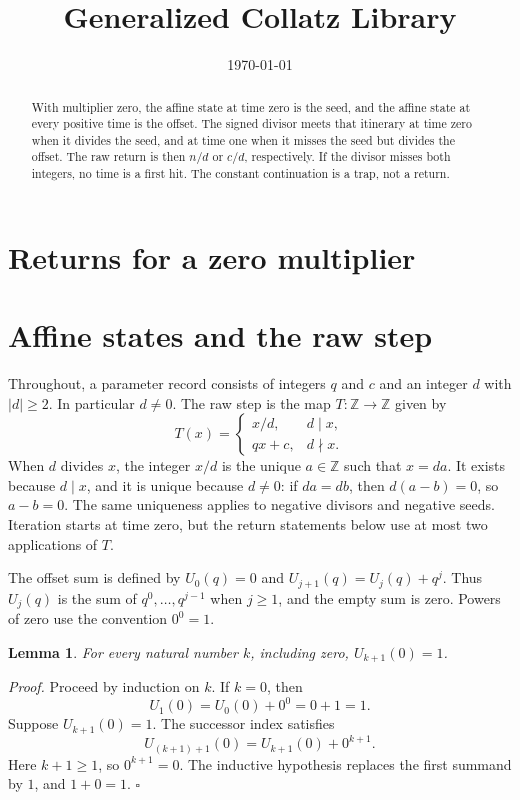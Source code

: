 \documentclass[11pt,letterpaper]{article}
\title{Generalized Collatz Library}
\author{}
\date{\today}
\newcommand{\Z}{\mathbb{Z}}
\newcommand{\Map}[3]{#1 \colon #2 \to #3}
\newtheorem{lemma}[theorem]{Lemma}
\newenvironment{proof}{\noindent\textit{Proof.}}{\hfill\(\square\)}
\begin{document}
\maketitle
\section*{Returns for a zero multiplier}

\begin{abstract}
With multiplier zero, the affine state at time zero is the seed, and the affine state at every positive time is the offset. The signed divisor meets that itinerary at time zero when it divides the seed, and at time one when it misses the seed but divides the offset. The raw return is then \(n/d\) or \(c/d\), respectively. If the divisor misses both integers, no time is a first hit. The constant continuation is a trap, not a return.
\end{abstract}

\section{Affine states and the raw step}

Throughout, a parameter record consists of integers \(q\) and \(c\) and an integer \(d\) with \(|d|\ge 2\). In particular \(d\neq 0\). The raw step is the map \(\Map{T}{\Z}{\Z}\) given by
\[
T(x)=\begin{cases}
x/d, & d\mid x,\\
qx+c, & d\nmid x.
\end{cases}
\]
When \(d\) divides \(x\), the integer \(x/d\) is the unique \(a\in\Z\) such that \(x=da\). It exists because \(d\mid x\), and it is unique because \(d\neq 0\): if \(da=db\), then \(d(a-b)=0\), so \(a-b=0\). The same uniqueness applies to negative divisors and negative seeds. Iteration starts at time zero, but the return statements below use at most two applications of \(T\).

The offset sum is defined by \(U_0(q)=0\) and \(U_{j+1}(q)=U_j(q)+q^j\). Thus \(U_j(q)\) is the sum of \(q^0,\ldots,q^{j-1}\) when \(j\ge 1\), and the empty sum is zero. Powers of zero use the convention \(0^0=1\).

\begin{lemma}
\label{lem:trap-sum-zero}
For every natural number \(k\), including zero, \(U_{k+1}(0)=1\).
\end{lemma}

\begin{proof}
Proceed by induction on \(k\). If \(k=0\), then
\[
U_1(0)=U_0(0)+0^0=0+1=1.
\]
Suppose \(U_{k+1}(0)=1\). The successor index satisfies
\[
U_{(k+1)+1}(0)=U_{k+1}(0)+0^{k+1}.
\]
Here \(k+1\ge 1\), so \(0^{k+1}=0\). The inductive hypothesis replaces the first summand by \(1\), and \(1+0=1\).
\end{proof}
\end{document}
